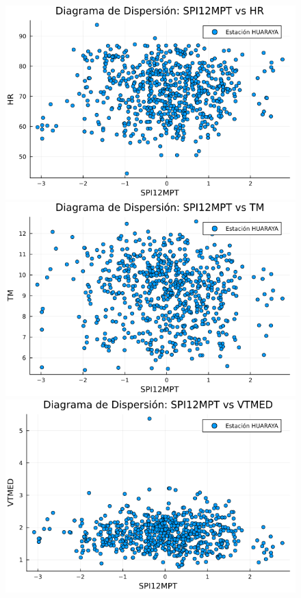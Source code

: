 \begin{figure}[htbp]
\begin{minipage}{0.32\textwidth}
    \centering
    \includegraphics[width=\linewidth]{Capitulos/Scaterplot/HUARAYA_SPI12MPT_vs_HR.png}
\end{minipage}\hfill
\begin{minipage}{0.32\textwidth}
    \centering
    \includegraphics[width=\linewidth]{Capitulos/Scaterplot/HUARAYA_SPI12MPT_vs_TM.png}
\end{minipage}\hfill
\begin{minipage}{0.32\textwidth}
    \centering
    \includegraphics[width=\linewidth]{Capitulos/Scaterplot/HUARAYA_SPI12MPT_vs_VTMED.png}
\end{minipage}


\end{figure}

